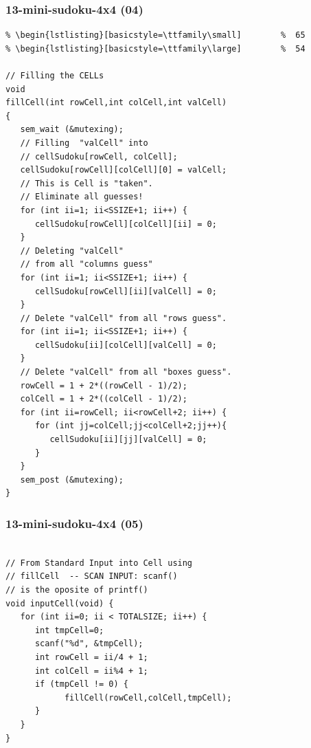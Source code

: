 \documentclass[aspectratio=169, xcolor=table, notheorems, hyperref={pdfpagelabels=false}]{beamer}
\begin{document}
\begin{frame}[fragile]
\frametitle{13-mini-sudoku-4x4 (04)}
\begin{lstlisting}[basicstyle=\ttfamily\tiny]         % 108
% \begin{lstlisting}[basicstyle=\ttfamily\footnotesize] %  72
% \begin{lstlisting}[basicstyle=\ttfamily\small]        %  65
% \begin{lstlisting}[basicstyle=\ttfamily\large]        %  54

// Filling the CELLs
void
fillCell(int rowCell,int colCell,int valCell)
{
   sem_wait (&mutexing);
   // Filling  "valCell" into 
   // cellSudoku[rowCell, colCell];
   cellSudoku[rowCell][colCell][0] = valCell;
   // This is Cell is "taken". 
   // Eliminate all guesses!
   for (int ii=1; ii<SSIZE+1; ii++) {
      cellSudoku[rowCell][colCell][ii] = 0;
   }
   // Deleting "valCell" 
   // from all "columns guess"
   for (int ii=1; ii<SSIZE+1; ii++) {
      cellSudoku[rowCell][ii][valCell] = 0;
   }
   // Delete "valCell" from all "rows guess".
   for (int ii=1; ii<SSIZE+1; ii++) {
      cellSudoku[ii][colCell][valCell] = 0;
   }
   // Delete "valCell" from all "boxes guess".
   rowCell = 1 + 2*((rowCell - 1)/2);
   colCell = 1 + 2*((colCell - 1)/2);
   for (int ii=rowCell; ii<rowCell+2; ii++) {
      for (int jj=colCell;jj<colCell+2;jj++){
         cellSudoku[ii][jj][valCell] = 0;
      }
   }
   sem_post (&mutexing);
}

\end{lstlisting}
\end{frame}

\begin{frame}[fragile]
\frametitle{13-mini-sudoku-4x4 (05)}
\begin{lstlisting}[basicstyle=\ttfamily\large]        %  54

// From Standard Input into Cell using 
// fillCell  -- SCAN INPUT: scanf() 
// is the oposite of printf()
void inputCell(void) {
   for (int ii=0; ii < TOTALSIZE; ii++) {
      int tmpCell=0;
      scanf("%d", &tmpCell);
      int rowCell = ii/4 + 1;
      int colCell = ii%4 + 1;
      if (tmpCell != 0) {
            fillCell(rowCell,colCell,tmpCell);
      }
   }
}

\end{lstlisting}
\end{frame}
\end{document}
